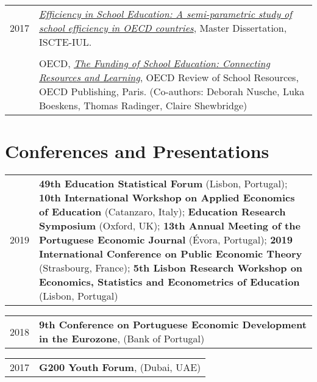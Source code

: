 \documentclass[a4paper,11pt]{article} %
\begin{document}
\begin{tabular}{r|p{15cm}}
	2017 & \href{http://hdl.handle.net/10071/16122}{\textit{Efficiency in School Education: A semi-parametric study of school efficiency in OECD countries}}, Master Dissertation, ISCTE-IUL.\\
	& \\
	& OECD, \href{http://www.oecd.org/governance/the-funding-of-school-education-9789264276147-en.htm}{\textit{The Funding of School Education: Connecting Resources and Learning}}, OECD Review of School Resources, OECD Publishing, Paris. (Co-authors: Deborah Nusche, Luka Boeskens, Thomas Radinger, Claire Shewbridge)\\
\end{tabular}	

\newpage

\section[Conferences and Presentations]{\faCommentsO \hspace{3pt} Conferences and Presentations}

\begin{tabular}{r|p{15cm}}
	2019 & \textbf{49th Education Statistical Forum} (Lisbon, Portugal); \textbf{10th International Workshop on Applied Economics of Education} (Catanzaro, Italy); \textbf{Education Research Symposium} (Oxford, UK); \textbf{13th Annual Meeting of the Portuguese Economic Journal} (Évora, Portugal); \textbf{2019 International Conference on Public Economic Theory} (Strasbourg, France); \textbf{5th Lisbon Research Workshop on Economics, Statistics and Econometrics of Education} (Lisbon, Portugal)  \\
\end{tabular}


\begin{tabular}{r|p{15cm}}
	2018 & \textbf{9th Conference on Portuguese Economic Development in the Eurozone}, (Bank of Portugal)
\end{tabular}

\begin{tabular}{r|p{15cm}}
	2017 & \textbf{G200 Youth Forum}, (Dubai, UAE) \\
	
\end{tabular}
\end{document}
